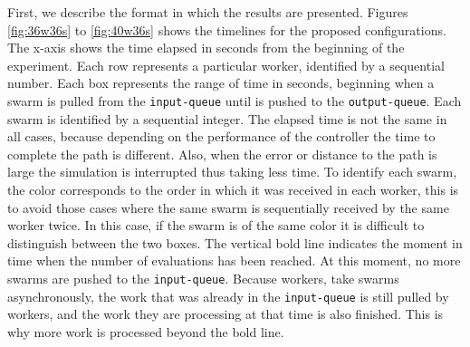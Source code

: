 \documentclass{cys}
\begin{document}
First, we describe the format in which the results are presented.
Figures \ref{fig:36w36s} to \ref{fig:40w36s} shows the timelines for the proposed 
configurations. The x-axis shows the time elapsed in seconds from 
the beginning of the experiment. Each row represents a particular worker, identified 
by a sequential number. Each box represents the range of time in seconds, beginning when a
swarm is pulled from the \texttt{input-queue} until is pushed to the \texttt{output-queue}.
Each swarm is identified by a sequential integer. The elapsed time is not the same in 
all cases, because depending on the performance of the controller the time to 
complete the path is different. Also, when the error or distance to 
the path is large the simulation is interrupted thus taking less time.
To identify each swarm, the color corresponds to the order in which it was received 
in each worker, this is to avoid those cases where the same swarm is sequentially received
by the same worker twice. In this case, if the swarm is of the same color it
is difficult to distinguish between the two boxes. The vertical bold line indicates 
the moment in time when the number of evaluations has been reached. At this moment,
no more swarms are pushed to the \texttt{input-queue}. Because workers,
take swarms asynchronously, the work that was already in the \texttt{input-queue} is still 
pulled by workers, and the work they are processing at that time is also finished. 
This is why more work is processed beyond the bold line.
\end{document}

